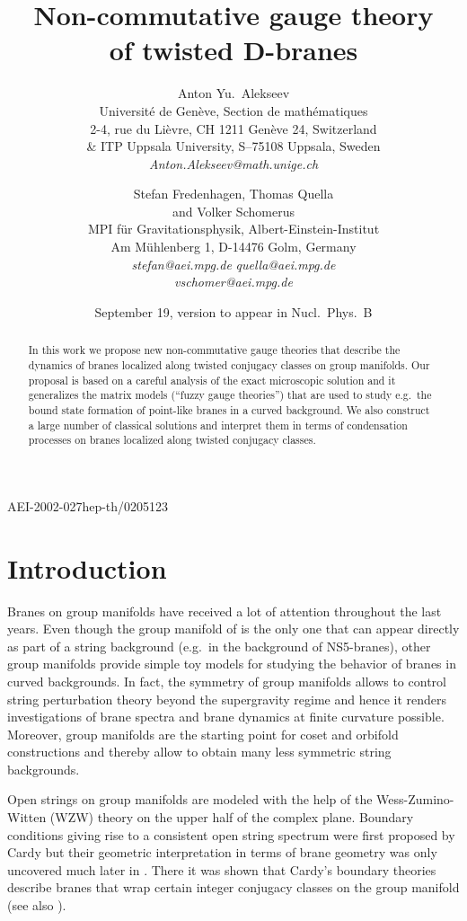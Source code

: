 \documentclass[12pt,a4paper]{article}
\title{\bf Non-commutative gauge theory \\[3mm]  
 \bf of twisted D-branes}
\author{{\sc Anton Yu.\ Alekseev}\\[3mm] 
Universit{\'e} de Gen{\`e}ve, Section de math{\'e}matiques\\ 
2-4, rue du Li{\`e}vre, CH 1211 Gen{\`e}ve 24, Switzerland\\
\& ITP Uppsala University, S--75108 Uppsala, Sweden\\[2mm]
{\em Anton.Alekseev@math.unige.ch} \vspace*{3mm}
\and
{\sc Stefan Fredenhagen, Thomas Quella}\\
 {\sc and Volker Schomerus} \\[3mm] 
MPI f{\"u}r Gravitationsphysik, Albert-Einstein-Institut\\
Am M{\"u}hlenberg 1, D-14476 Golm, Germany\\[2mm]  
{\em stefan@aei.mpg.de}\quad 
{\em quella@aei.mpg.de} \\
 {\em vschomer@aei.mpg.de}}
\date{\medskip\small September 19, version to appear in Nucl.\ Phys.\ B}
\begin{document}
\maketitle
\baselineskip16pt 
  
\begin{abstract}
In this work we propose new non-commutative gauge theories that 
describe the dynamics of branes localized along twisted conjugacy 
classes on group manifolds. Our proposal is based on a careful 
analysis of the exact microscopic solution and it generalizes 
the matrix models (``fuzzy gauge theories'') that are used to 
study e.g.\  the bound state formation of point-like branes in a 
curved background. We also construct a large number of classical 
solutions and interpret them in terms of condensation processes 
on branes localized along twisted conjugacy classes.
\end{abstract}

\vspace*{-20cm}\noindent AEI-2002-027\hfill hep-th/0205123

\newpage
  
\section{Introduction}

Branes on group manifolds have received a lot of attention 
throughout the last years. Even though the group manifold 
of \coordHE{} is the only one that can appear directly 
as part of a string background (e.g.\ in the background of 
NS5-branes), other group manifolds provide simple toy models 
for studying the behavior of branes in curved backgrounds. In 
fact, the symmetry of group manifolds allows to control string 
perturbation theory beyond the supergravity regime and hence 
it renders investigations of brane spectra and brane dynamics 
at finite curvature possible. Moreover, group manifolds are the 
starting point for coset and orbifold constructions and thereby 
allow to obtain many less symmetric string backgrounds.%
\smallskip

Open strings on group manifolds are modeled with the help 
of the Wess-Zumino-Witten (WZW) theory on the upper half 
\coordHE{} of the complex plane. Boundary 
conditions giving rise to a consistent open string spectrum 
were first proposed by Cardy \cite{Cardy:1989ir} but their 
geometric interpretation in terms of brane geometry was only 
uncovered much later in \cite{Alekseev:1998mc}. There it was 
shown that Cardy's boundary theories describe branes that 
wrap certain integer conjugacy classes on the group manifold 
\coordHE{} (see also \cite{Gawedzki:1999bq,Stanciu:1999id}). 
\smallskip
\end{document}
